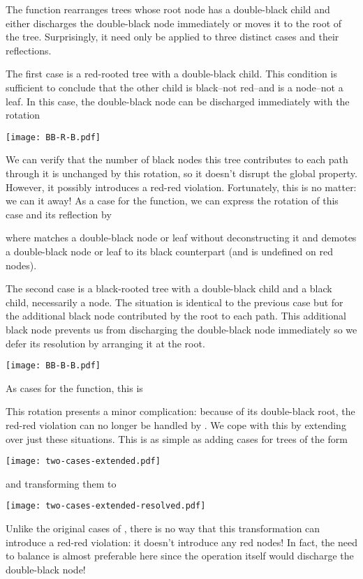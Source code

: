 \documentclass[preprint]{sigplanconf}
\begin{document}
The  function rearranges trees whose root node has a double-black child and either discharges the double-black node immediately or moves it to the root of the tree. Surprisingly, it need only be applied to three distinct cases and their reflections.

The first case is a red-rooted tree with a double-black child. This condition is sufficient to conclude that the other child is black--not red--and is a node--not a leaf. In this case, the double-black node can be discharged immediately with the rotation
\begin{center}
\texttt{[image: BB-R-B.pdf]}
\end{center}
We can verify that the number of black nodes this tree contributes to each path through it is unchanged by this rotation, so it doesn't disrupt the global property. However, it possibly introduces a red-red violation. Fortunately, this is no matter: we can  it away! As a case for the  function, we can express the rotation of this case and its reflection by
\begin{schemedisplay}
[(R (BB? a-x-b) y (B c z d))
 (balance (B (R (-B a-x-b) y c) z d))]
[(R (B a x b) y (BB? c-z-d))
 (balance (B a x (R b y (-B c-z-d))))]
\end{schemedisplay}
where  matches a double-black node or leaf without deconstructing it and  demotes a double-black node or leaf to its black counterpart (and is undefined on red nodes).

The second case is a black-rooted tree with a double-black child and a black child, necessarily a node. The situation is identical to the previous case but for the additional black node contributed by the root to each path. This additional black node prevents us from discharging the double-black node immediately so we defer its resolution by arranging it at the root.
\begin{center}
\texttt{[image: BB-B-B.pdf]}
\end{center}
As cases for the  function, this is
\begin{schemedisplay}
[(B (BB? a-x-b) y (B c z d))
 (balance (BB (R (-B a-x-b) y c) z d))]
[(B (B a x b) y (BB? c-z-d))
 (balance (BB a x (R b y (-B c-z-d))))]
\end{schemedisplay}
This rotation presents a minor complication: because of its double-black root, the red-red violation can no longer be handled by . We cope with this by extending  over just these situations. This is as simple as adding cases for trees of the form
\begin{center}
\texttt{[image: two-cases-extended.pdf]}
\end{center}
and transforming them to
\begin{center}
\texttt{[image: two-cases-extended-resolved.pdf]}
\end{center}
Unlike the original cases of , there is no way that this transformation can introduce a red-red violation: it doesn't introduce any red nodes! In fact, the need to balance is almost preferable here since the operation itself would discharge the double-black node!
\end{document}
